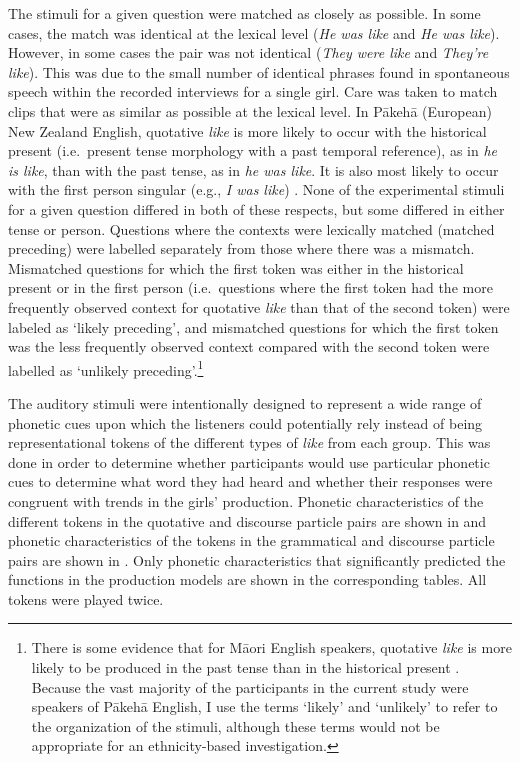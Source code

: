 The stimuli for a given question were matched as closely as possible. In some cases, the match was identical at the lexical level (\textit{He was like} and \textit{He was like}). However, in some cases the pair was not identical (\textit{They were like} and \textit{They're like}). This was due to the small number of identical phrases found in spontaneous speech within the recorded interviews for a single girl. Care was taken to match clips that were as similar as possible at the lexical level. In P\=akeh\=a (European) New Zealand English, quotative \textit{like} is more likely to occur with the historical present (i.e.~present tense morphology with a past temporal reference), as in \textit{he is like}, than with the past tense, as in \textit{he was like}. It is also most likely to occur with the first person singular (e.g., \textit{I was like}) \citep{buchstallerdarcy2009}. None of the experimental stimuli for a given question differed in both of these respects, but some differed in either tense or person. Questions where the contexts were lexically matched (matched preceding) were labelled separately from those where there was a mismatch. Mismatched questions for which the first token was either in the historical present or in the first person (i.e.~questions where the first token had the more frequently observed context for quotative \textit{like} than that of the second token) were labeled as `likely preceding', and mismatched questions for which the first token was the less frequently observed context compared with the second token were labelled as `unlikely preceding'.\footnote{There is some evidence that for M\=aori English speakers, quotative \textit{like} is more likely to be produced in the past tense than in the historical present \citep{darcy2010}. Because the vast majority of the participants in the current study were speakers of P\=akeh\=a English, I use the terms `likely' and `unlikely' to refer to the organization of the stimuli, although these terms would not be appropriate for an ethnicity-based investigation.}

The auditory stimuli were intentionally designed to represent a wide range of phonetic cues upon which the listeners could potentially rely instead of being representational tokens of the different types of \textit{like} from each group. This was done in order to determine whether participants would use particular phonetic cues to determine what word they had heard and whether their responses were congruent with trends in the girls' production. Phonetic characteristics of the different tokens in the quotative and discourse particle pairs are shown in  and phonetic characteristics of the tokens in the grammatical and discourse particle pairs are shown in . Only phonetic characteristics that significantly predicted the functions in the production models are shown in the corresponding tables. All tokens were played twice.

